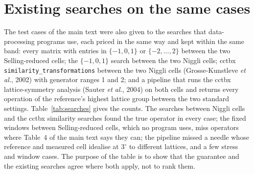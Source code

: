 \documentclass[preprint,pdf]{iucr}          %
\begin{document}
\section{Existing searches on the same cases}\label{si:searches}

The test cases of the main text were also given to the searches that data-processing programs use, each priced in the same way and kept within the same band: every matrix with entries in $\{-1,0,1\}$ or $\{-2,\dots,2\}$ between the two Selling-reduced cells; the $\{-1,0,1\}$ search between the two Niggli cells; cctbx \texttt{similarity\_\allowbreak transformations} between the two Niggli cells (Grosse-Kunstleve \emph{et al.}, 2002) with generator ranges 1 and 2; and a pipeline that runs the cctbx lattice-symmetry analysis (Sauter \emph{et al.}, 2004) on both cells and returns every operation of the reference's highest lattice group between the two standard settings. Table~\ref{tab:searches} gives the counts. The searches between Niggli cells and the cctbx similarity searches found the true operator in every case; the fixed windows between Selling-reduced cells, which no program uses, miss operators where Table~4 of the main text says they can; the pipeline missed a needle whose reference and measured cell idealise at $3^\circ$ to different lattices, and a few stress and window cases. The purpose of the table is to show that the guarantee and the existing searches agree where both apply, not to rank them.
\end{document}
